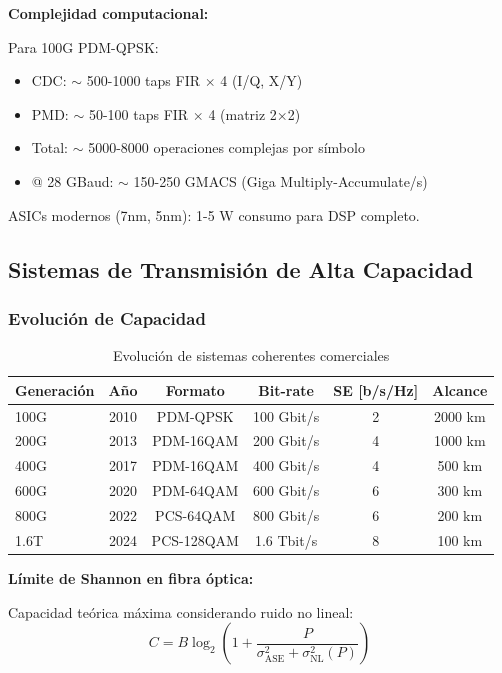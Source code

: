 \documentclass[11pt,a4paper]{article}
\begin{document}
\textbf{Complejidad computacional:}

Para 100G PDM-QPSK:
\begin{itemize}
    \item CDC: $\sim$ 500-1000 taps FIR $\times$ 4 (I/Q, X/Y)
    \item PMD: $\sim$ 50-100 taps FIR $\times$ 4 (matriz 2×2)
    \item Total: $\sim$ 5000-8000 operaciones complejas por símbolo
    \item @ 28 GBaud: $\sim$ 150-250 GMACS (Giga Multiply-Accumulate/s)
\end{itemize}

ASICs modernos (7nm, 5nm): 1-5 W consumo para DSP completo.

\subsection{Sistemas de Transmisión de Alta Capacidad}

\subsubsection{Evolución de Capacidad}

\begin{table}[h]
\centering
\caption{Evolución de sistemas coherentes comerciales}
\begin{tabular}{lccccc}
\hline
\textbf{Generación} & \textbf{Año} & \textbf{Formato} & \textbf{Bit-rate} & \textbf{SE [b/s/Hz]} & \textbf{Alcance} \\
\hline
100G & 2010 & PDM-QPSK & 100 Gbit/s & 2 & 2000 km \\
200G & 2013 & PDM-16QAM & 200 Gbit/s & 4 & 1000 km \\
400G & 2017 & PDM-16QAM & 400 Gbit/s & 4 & 500 km \\
600G & 2020 & PDM-64QAM & 600 Gbit/s & 6 & 300 km \\
800G & 2022 & PCS-64QAM & 800 Gbit/s & 6 & 200 km \\
1.6T & 2024 & PCS-128QAM & 1.6 Tbit/s & 8 & 100 km \\
\hline
\end{tabular}
\end{table}

\textbf{Límite de Shannon en fibra óptica:}

Capacidad teórica máxima considerando ruido no lineal:
\begin{equation}
    C = B\log_2\left(1 + \frac{P}{\sigma_{\text{ASE}}^2 + \sigma_{\text{NL}}^2(P)}\right)
\end{equation}
\end{document}
